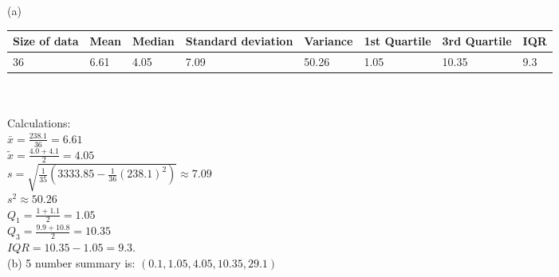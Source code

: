 \documentclass[bigtut]{tutorial}\usepackage[]{graphicx}\usepackage[]{color}
\begin{document}
\begin{tutorial}
\begin{questions}


\begin{solution}

(a) \\
\begin{tabular}{| l| l| l| l| l| l| l| l|} \hline
Size of data & Mean & Median & Standard deviation & Variance & 1st Quartile & 3rd Quartile & IQR  \\ \hline
36 & 6.61 & 4.05 & 7.09 & 50.26 & 1.05 & 10.35 & 9.3 \\  \hline 
\end{tabular} \\ \\

Calculations: \\
$\bar{x} = \frac{238.1}{36} = 6.61$ \\
$\tilde{x} = \frac{ 4.0 + 4.1 }{2} = 4.05$ \\
$s= \sqrt { \frac{1}{35}\left( 3333.85 - \frac{1}{36} (238.1)^2 \right) } \approx 7.09$ \\
$s^2  \approx 50.26$ \\
$Q_{1} = \frac{1 + 1.1}{2} = 1.05 $ \\
$Q_{3} = \frac{ 9.9 + 10.8}{2} = 10.35$ \\
$IQR = 10.35-1.05 = 9.3$. \\

(b) 
5 number summary is: $(0.1,1.05,4.05,10.35,29.1)$  \\


\end{solution}
\end{questions}
\end{tutorial}
\end{document}
